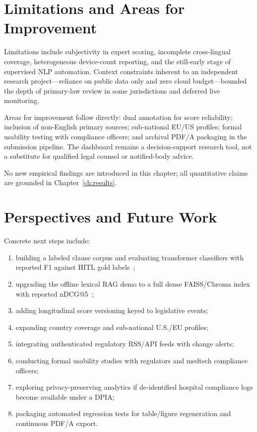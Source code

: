 \section{Limitations and Areas for Improvement}
\label{sec:limitations}

Limitations include subjectivity in expert scoring, incomplete cross-lingual coverage, heterogeneous device-count reporting, and the still-early stage of supervised NLP automation. Context constraints inherent to an independent research project---reliance on public data only and zero cloud budget---bounded the depth of primary-law review in some jurisdictions and deferred live monitoring.

Areas for improvement follow directly: dual annotation for score reliability; inclusion of non-English primary sources; sub-national EU/US profiles; formal usability testing with compliance officers; and archival PDF/A packaging in the submission pipeline. The dashboard remains a decision-support research tool, not a substitute for qualified legal counsel or notified-body advice.

No new empirical findings are introduced in this chapter; all quantitative claims are grounded in Chapter~\ref{ch:results}.

\section{Perspectives and Future Work}
\label{sec:future}

Concrete next steps include:
\begin{enumerate}
  \item building a labeled clause corpus and evaluating transformer classifiers with reported F1 against HITL gold labels~\cite{devlin2019,vaswani2017};
  \item upgrading the offline lexical RAG demo to a full dense FAISS/Chroma index with reported nDCG@5~\cite{lewis2020rag,karpukhin2020};
  \item adding longitudinal score versioning keyed to legislative events;
  \item expanding country coverage and sub-national U.S./EU profiles;
  \item integrating authenticated regulatory RSS/API feeds with change alerts;
  \item conducting formal usability studies with regulators and medtech compliance officers;
  \item exploring privacy-preserving analytics if de-identified hospital compliance logs become available under a DPIA;
  \item packaging automated regression tests for table/figure regeneration and continuous PDF/A export.
\end{enumerate}

